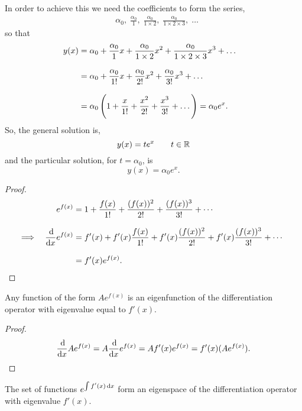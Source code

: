 \documentclass[MathsNotesBase.tex]{subfiles}
\begin{document}
{		In order to achieve this we need the coefficients to form the series,
		\begin{align*}
		&\alpha_0,\; \frac{\alpha_0}{1},\; \frac{\alpha_0}{1 \times 2},\; \frac{\alpha_0}{1 \times 2 \times 3},\; \dots
		\end{align*}
		so that
		\begin{align*}
		y(x) &= \alpha_0 + \frac{\alpha_0}{1}x + \frac{\alpha_0}{1 \times 2}x^2 + \frac{\alpha_0}{1 \times 2 \times 3}x^3 + \dots \\[8pt]
		&= \alpha_0 + \frac{\alpha_0}{1!}x + \frac{\alpha_0}{2!}x^2 + \frac{\alpha_0}{3!}x^3 + \dots &\text{\scriptsize{}} \\[8pt]
		&= \alpha_0\left(1 + \frac{x}{1!} + \frac{x^2}{2!} + \frac{x^3}{3!} + \dots \right) = \alpha_0 e^x.
		\end{align*}
		So, the general solution is,
		\[ y(x) = t e^x \hspace{20pt} t \in \mathbb{R}^{} \]
		and the particular solution, for ${ t = \alpha_0 }$, is
		\[ y(x) = \alpha_0 e^x. \]
		
		\bigskip\bigskip
		\begin{proof}
			\begin{align*}
			&& e^{f(x)} &= 1 + \frac{f(x)}{1!} + \frac{(f(x))^2}{2!} + \frac{(f(x))^3}{3!} + \cdots \\[8pt]
			&\implies & \frac{\dif}{\dif x} e^{f(x)} &= f'(x) + f'(x)\frac{f(x)}{1!} + f'(x)\frac{(f(x))^2}{2!} + f'(x)\frac{(f(x))^3}{3!} + \cdots &\sidecomment{} \\[8pt]
			&&&= f'(x) e^{f(x)}.
			\end{align*}
		\end{proof}
		\begin{corollary}
			Any function of the form $Ae^{f(x)}$ is an eigenfunction of the differentiation operator with eigenvalue equal to $f'(x)$.
		\end{corollary}
		\begin{proof}
			\[ \frac{\dif}{\dif x} Ae^{f(x)} = A \frac{\dif}{\dif x} e^{f(x)} = A f'(x)e^{f(x)} = f'(x)(Ae^{f(x)}). \qedhere \]
		\end{proof}
		\begin{corollary}
			The set of functions $e^{\int f'(x) \dif x}$ form an eigenspace of the differentiation operator with eigenvalue $f'(x)$.
		\end{corollary}
	
}
\end{document}
